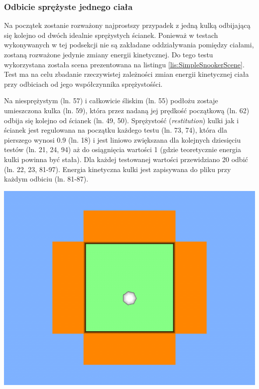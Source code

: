 \subsubsection{Odbicie sprężyste jednego ciała}
Na początek zostanie rozważony najprostszy przypadek z jedną kulką
odbijającą się kolejno od dwóch idealnie sprężystych ścianek. Ponieważ w
testach wykonywanych w tej podsekcji nie są zakładane oddziaływania pomiędzy
ciałami, zostaną rozważone jedynie zmiany energii kinetycznej. Do tego testu
wykorzystana została scena prezentowana na listingu
\ref{lis:SimpleSnookerScene}. Test ma na celu zbadanie rzeczywistej zależności
zmian energii kinetycznej ciała przy odbiciach od jego współczynnika
sprężystośści.


Na niesprężystym (ln. 57) i całkowicie śliskim (ln. 55) podłożu zostaje
umieszczona kulka (ln. 59), która przez nadaną jej prędkość początkową (ln. 62)
odbija się kolejno od ścianek (ln. 49, 50). Sprężystość (\emph{restitution})
kulki jak i ścianek jest regulowana na początku każdego testu (ln. 73, 74),
która dla pierszego wynosi 0.9 (ln. 18) i jest liniowo zwiększana dla kolejnych
dziesięciu testów (ln. 21, 24, 94) aż do osiągnięcia wartości 1 (gdzie
teoretycznie energia kulki powinna być stała).
Dla każdej testowanej wartości przewidziano 20 odbić (ln. 22, 23, 81-97).
Energia kinetyczna kulki jest zapisywana do pliku przy każdym odbiciu (ln.
81-87).

\begin{center}
\includegraphics[scale = 0.5]{./img/SimpleSnookerScene.png}
\end{center}

